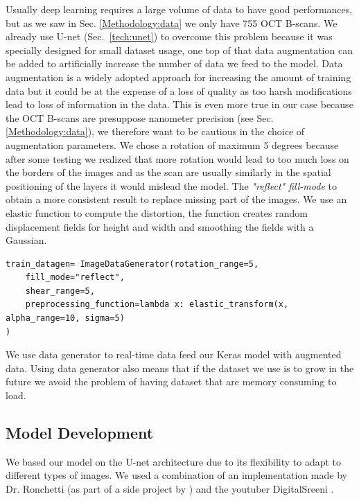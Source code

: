 \documentclass[12pt,a4paper]{scrartcl}
\begin{document}
Usually deep learning requires a large volume of data to have good performances, but as we saw in Sec. \ref{Methodology:data} we only have 755 OCT B-scans. We already use U-net (Sec.~\ref{tech:unet}) to overcome this problem because it was specially designed for small dataset usage, one top of that data augmentation can be added to artificially increase the number of data we feed to the model. Data augmentation is a widely adopted approach for increasing the amount of training data \cite{AugAndEval:2017} but it could be at the expense of a loss of quality as too harsh modifications lead to loss of information in the data. This is even more true in our case because the OCT B-scans are presuppose nanometer precision (see Sec. \ref{Methodology:data}), we therefore want to be cautious in the choice of augmentation parameters.
We chose a rotation of maximum 5 degrees because after some testing we realized that more rotation would lead to too much loss on the borders of the images and as the scan are usually similarly in the spatial positioning of the layers it would mislead the model. The \emph{"reflect" fill-mode} to obtain a more consistent result to replace missing part of the images. We use an elastic function to compute the distortion, the function creates random displacement fields for height and width and smoothing the fields with a Gaussian. 
\begin{lstlisting}[caption={Base generator for image augmentation, the definition of the 2 seperate generator (image and mask) can be found in \emph{train.py}}]
train_datagen= ImageDataGenerator(rotation_range=5,
    fill_mode="reflect",
    shear_range=5,
    preprocessing_function=lambda x: elastic_transform(x, alpha_range=10, sigma=5)
)
\end{lstlisting}

We use data generator to real-time data feed our Keras model with augmented data. Using data generator also means that if the dataset we use is to grow in the future we avoid the problem of having dataset that are memory consuming to load.


\subsection{Model Development}

We based our model on the U-net architecture due to its flexibility to adapt to different types of images. We used a combination of an implementation made by Dr. Ronchetti (as part of a side project by \cite{Ronchetti2019}) and the youtuber DigitalSreeni \cite{DigitalSreeni}.
\end{document}

